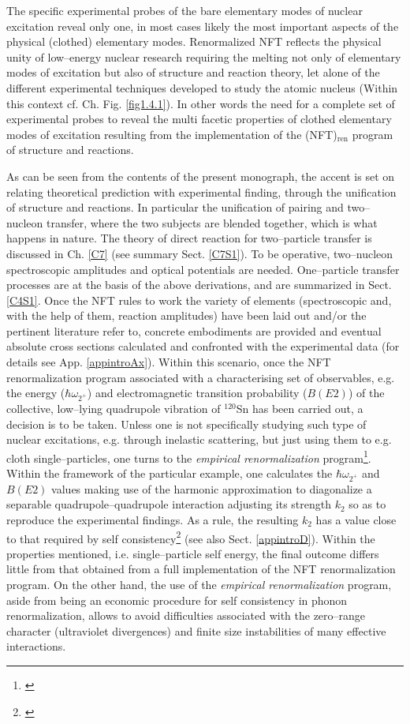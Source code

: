 
  The specific experimental probes of the bare elementary modes of nuclear excitation reveal only one, in most cases likely the most important aspects of the physical (clothed) elementary modes. Renormalized NFT  reflects the physical unity of  low--energy nuclear research requiring the melting not only of elementary modes of excitation but also of structure and reaction theory, let alone of the different experimental techniques developed to study the atomic nucleus (Within this context cf. Ch.  Fig. \ref{fig1.4.1}). In other words the need for a complete set of experimental probes to reveal the multi facetic properties of clothed elementary modes of excitation resulting from the implementation of the (NFT)$_{\text{ren}}$ program of structure and reactions.


As can be seen from the contents of the present monograph, the accent is set on relating theoretical prediction with experimental finding, through the unification of structure and reactions. In particular the unification of pairing and two--nucleon transfer, where the two subjects are blended together, which is what happens in nature.
The theory of direct reaction for two--particle transfer is discussed in Ch. \ref{C7} (see summary Sect. \ref{C7S1}). To be operative, two--nucleon spectroscopic amplitudes and optical potentials are needed. One--particle transfer processes are at the basis of the above derivations, and are summarized in Sect. \ref{C4S1}. Once the NFT rules to work the variety of elements (spectroscopic and, with the help of them, reaction amplitudes) have been laid  out and/or the pertinent literature refer to, concrete embodiments are provided and eventual absolute cross sections calculated and confronted with the experimental data (for details see App. \ref{appintroAx}). Within this scenario, once the NFT renormalization program associated with a characterising set of observables, e.g. the energy ($\hbar \omega_{2^+}$) and electromagnetic transition probability ($B(E2)$) of the collective, low--lying quadrupole vibration of $^{120}$Sn has been carried out, a decision is to be taken. Unless one is not specifically studying such type of nuclear excitations, e.g. through inelastic scattering, but just using them to e.g. cloth single--particles, one turns to the \textit{empirical renormalization} program\footnote{\cite{Barranco:01,Idini:14,Idini:15,Broglia:16}}. Within the framework of the particular example, one calculates the $\hbar \omega_{2^+}$ and $B(E2)$ values making use of the harmonic approximation to diagonalize  a separable quadrupole--quadrupole interaction adjusting its strength $k_2$ so as to reproduce the experimental findings. As a rule, the resulting $k_2$ has a value close to that required by self consistency\footnote{\cite{Bohr:75}} (see also Sect. \ref{appintroD}). Within the properties mentioned, i.e. single--particle self energy, the final outcome differs little from  that obtained from a full implementation of the NFT renormalization program. On the other hand, the use of the \textit{empirical renormalization} program, aside from being an economic procedure for self consistency in phonon renormalization, allows to avoid difficulties associated with the zero--range character (ultraviolet divergences) and finite size instabilities of many effective  interactions.


